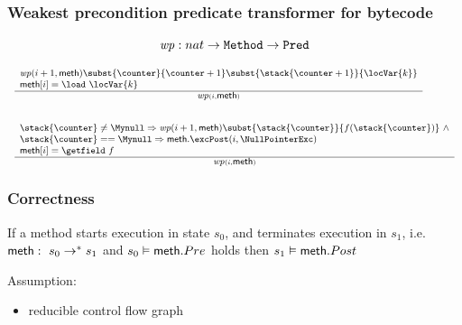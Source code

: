 \documentclass{beamer}
\begin{document}
\begin{frame}\frametitle{Weakest precondition predicate transformer for bytecode}
\begin{definition}
   $$\mbox{\rm\textit{wp}}:  nat \rightarrow \mbox{\rm\texttt{Method}}  \rightarrow \mbox{\rm\texttt{Pred}} $$
\end{definition}


   $$ {\small \begin{array}{l}
        
      \frac{ \begin{array}{l}
	       \wpi(i+1,\methodd)\subst{\counter}{\counter+1} \subst{\stack{\counter + 1}}{\locVar{k}} \\
              \methodd[i] = \load \  \locVar{k}
             \end{array}
           }{\wpi(i,\methodd )} 
         
	 
	\\\\\\

      \frac{\begin{array}{l} 
                  \stack{\counter } \neq \Mynull \Rightarrow 
                            \wpi(i+1,\methodd)\subst{\stack{\counter}}{f(\stack{\counter} )} \ \wedge \\ 
			   
			     \stack{\counter } == \Mynull \Rightarrow \methodd.\excPost( i, \NullPointerExc) \\
                  \methodd[i] = \getfield \ f 
          \end{array}
     } { \wpi(i,\methodd ) }
        
      \end{array} } $$

\end{frame}

\begin{frame}\frametitle{Correctness}
  \begin{definition} 
    If a method \methodd{} starts execution in state $s_0$, and terminates execution in $s_1$, i.e.  \ $\mbox{\rm\textsf{meth}}: \  s_0 \rightarrow^{*} s_1 $ and
    $s_0 \vDash \mbox{\rm\textsf{meth}}.Pre $ holds     then $s_1 \vDash \mbox{\rm\textsf{meth}}.Post$
    \end{definition}
 
Assumption: 
\begin{itemize}
   \item reducible control flow graph 
\end{itemize}

\end{frame}
\end{document}
